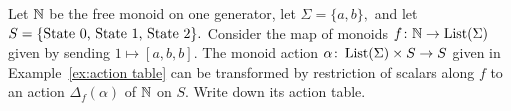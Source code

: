 \documentclass[CT4S-EN-RU]{subfiles}
\begin{document}
\begin{exerciseENG}
Let ${\mathbb N}$ be the free monoid on one generator, let $\Sigma=\{a,b\},$ and let $S=\{\textnormal{State 0, State 1, State 2}\}.$ Consider the map of monoids $f\colon{\mathbb N}\rightarrow\operatorname{List}(\Sigma)$ given by sending $1\mapsto [a,b,b].$ The monoid action $\alpha\colon\operatorname{List}(\Sigma)\times S\rightarrow S$ given in Example~\ref{ex:action table} can be transformed by restriction of scalars along $f$ to an action $\Delta_f(\alpha)$ of ${\mathbb N}$ on $S.$ Write down its action table.
\end{exerciseENG}

\begin{exerciseRUS}
\end{exerciseRUS}
\end{document}
